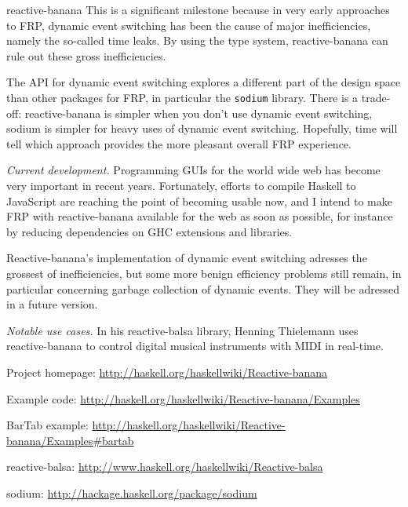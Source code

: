 \begin{hcarentry}[updated]{reactive-banana}
This is a significant milestone because in very early approaches to FRP, dynamic event switching has been the cause of major inefficiencies, namely the so-called time leaks. By using the type system, reactive-banana can rule out these gross inefficiencies.

The API for dynamic event switching explores a different part of the design space than other packages for FRP, in particular the \verb!sodium! library. There is a trade-off: reactive-banana is simpler when you don't use dynamic event switching, sodium is simpler for heavy uses of dynamic event switching. Hopefully, time will tell which approach provides the more pleasant overall FRP experience.

\emph{Current development.}
Programming GUIs for the world wide web has become very important in recent years. Fortunately, efforts to compile Haskell to JavaScript are reaching the point of becoming usable now, and I intend to make FRP with reactive-banana available for the web as soon as possible, for instance by reducing dependencies on GHC extensions and libraries.

Reactive-banana's implementation of dynamic event switching adresses the grossest of inefficiencies, but some more benign efficiency problems still remain, in particular concerning garbage collection of dynamic events. They will be adressed in a future version.

\emph{Notable use cases.} In his reactive-balsa library, Henning Thielemann uses reactive-banana to control digital musical instruments with MIDI in real-time.

\FurtherReading
\begin{compactitem}
\item Project homepage: \url{http://haskell.org/haskellwiki/Reactive-banana}
\item Example code: \url{http://haskell.org/haskellwiki/Reactive-banana/Examples}
\item BarTab example: \url{http://haskell.org/haskellwiki/Reactive-banana/Examples#bartab}
\item reactive-balsa: \url{http://www.haskell.org/haskellwiki/Reactive-balsa}
\item sodium: \url{http://hackage.haskell.org/package/sodium}
\end{compactitem}
\end{hcarentry}
